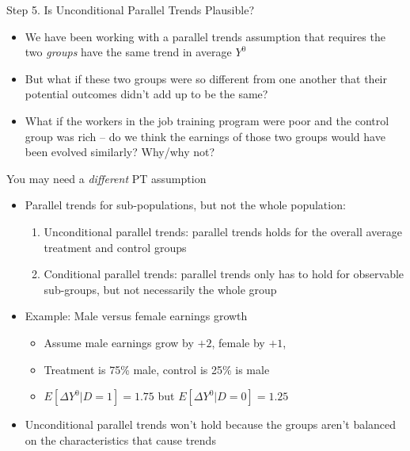 \documentclass{beamer}
\begin{document}
\begin{frame}{Step 5. Is Unconditional Parallel Trends Plausible?}

\begin{itemize}

\item We have been working with a parallel trends assumption that requires the two \emph{groups} have the same trend in average $Y^0$

\item But what if these two groups were so different from one another that their potential outcomes didn't add up to be the same?

\item What if the workers in the job training program were poor and the control group was rich -- do we think the earnings of those two groups would have been evolved similarly?  Why/why not?



\end{itemize}

\end{frame}


\begin{frame}{You may need a \emph{different} PT assumption}

\begin{itemize}
\item Parallel trends for sub-populations, but not the whole population:
	\begin{enumerate}
	\item Unconditional parallel trends:  parallel trends holds for the overall average treatment and control groups
	\item Conditional parallel trends: parallel trends only has to hold for observable sub-groups, but not necessarily the whole group
	\end{enumerate}
\item Example: Male versus female earnings growth
	\begin{itemize}
	\item Assume male earnings grow by $+2$, female by $+1$, 
	\item Treatment is 75\% male, control is 25\% is male
	\item $E[\Delta Y^0|D=1]=1.75$ but $E[\Delta Y^0|D=0]=1.25$
	\end{itemize}
\item Unconditional parallel trends won't hold because the groups aren't balanced on the characteristics that cause trends 
\end{itemize}

\end{frame}
\end{document}

